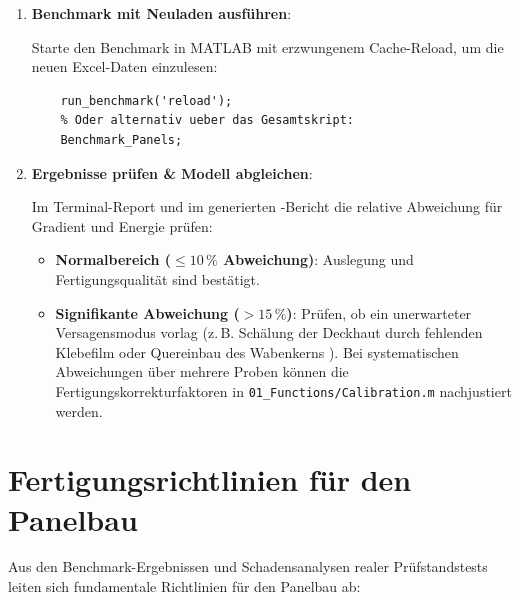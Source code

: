 \begin{enumerate}
    \item \textbf{Benchmark mit Neuladen ausführen}: \par
    Starte den Benchmark in MATLAB mit erzwungenem Cache-Reload, um die neuen Excel-Daten einzulesen:
    \begin{lstlisting}[style=vscodeLightMatlab]
    % Im MATLAB Command Window:
    run_benchmark('reload');
    % Oder alternativ ueber das Gesamtskript:
    Benchmark_Panels;
    \end{lstlisting}

    \item \textbf{Ergebnisse prüfen \& Modell abgleichen}: \par
    Im Terminal-Report und im generierten -Bericht die relative Abweichung für Gradient und Energie prüfen:
    \begin{itemize}
        \item \textbf{Normalbereich ($\le 10\,\%$ Abweichung)}: Auslegung und Fertigungsqualität sind bestätigt.
        \item \textbf{Signifikante Abweichung ($> 15\,\%$)}: Prüfen, ob ein unerwarteter Versagensmodus vorlag (z.\,B. Schälung der Deckhaut durch fehlenden Klebefilm  oder Quereinbau des Wabenkerns ). Bei systematischen Abweichungen über mehrere Proben können die Fertigungskorrekturfaktoren in \texttt{01\_Functions/Calibration.m} nachjustiert werden.
    \end{itemize}
\end{enumerate}

\section{Fertigungsrichtlinien für den Panelbau} \label{sec:fertigungsrichtlinien}

Aus den Benchmark-Ergebnissen und Schadensanalysen realer Prüfstandstests leiten sich fundamentale Richtlinien für den Panelbau ab:

